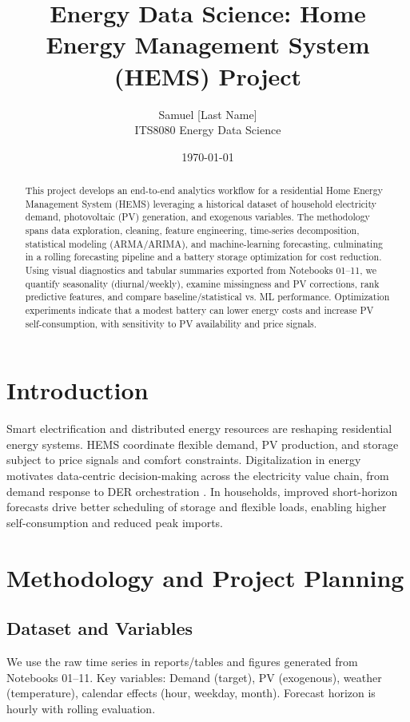 \documentclass[12pt,a4paper]{article}
\title{\textbf{Energy Data Science: Home Energy Management System (HEMS) Project}}
\author{Samuel [Last Name]\\ITS8080 Energy Data Science}
\date{\today}
\begin{document}
\justifying
\maketitle
\thispagestyle{empty}

\begin{abstract}
This project develops an end-to-end analytics workflow for a residential Home Energy Management System (HEMS) leveraging a historical dataset of household electricity demand, photovoltaic (PV) generation, and exogenous variables. The methodology spans data exploration, cleaning, feature engineering, time-series decomposition, statistical modeling (ARMA/ARIMA), and machine-learning forecasting, culminating in a rolling forecasting pipeline and a battery storage optimization for cost reduction. Using visual diagnostics and tabular summaries exported from Notebooks 01--11, we quantify seasonality (diurnal/weekly), examine missingness and PV corrections, rank predictive features, and compare baseline/statistical vs. ML performance. Optimization experiments indicate that a modest battery can lower energy costs and increase PV self-consumption, with sensitivity to PV availability and price signals.
\end{abstract}

\clearpage
\tableofcontents
\listoffigures
\listoftables
\clearpage

\section{Introduction}
Smart electrification and distributed energy resources are reshaping residential energy systems. HEMS coordinate flexible demand, PV production, and storage subject to price signals and comfort constraints. Digitalization in energy motivates data-centric decision-making across the electricity value chain, from demand response to DER orchestration \cite{IEA2017,Palensky2011}. In households, improved short-horizon forecasts drive better scheduling of storage and flexible loads, enabling higher self-consumption and reduced peak imports.

\section{Methodology and Project Planning}
\subsection{Dataset and Variables}
We use the raw time series in reports/tables and figures generated from Notebooks 01--11. Key variables: Demand (target), PV (exogenous), weather (temperature), calendar effects (hour, weekday, month). Forecast horizon is hourly with rolling evaluation.
\end{document}
